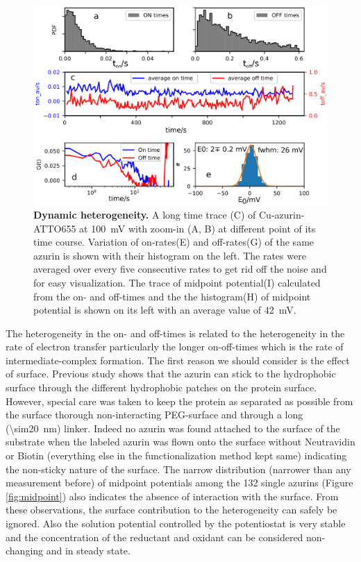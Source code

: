 \documentclass[journal=jacsat,manuscript=article]{achemso}
\begin{document}
\begin{figure}
	\centering
	\includegraphics{long_azurin_trace}
	\caption{\textbf{Dynamic heterogeneity.} A long time trace (C) of Cu-azurin-ATTO655 at \SI{100}{\mV} with zoom-in (A, B) at different point of its time course.
	Variation of on-rates(E) and off-rates(G) of the same azurin is shown with their histogram on the left.
	The rates were averaged over every five consecutive rates to get rid off the noise and for easy visualization.
	The trace of midpoint potential(I) calculated from the on- and off-times and the the histogram(H) of midpoint potential is shown on its left with an average value of \SI{42}{\mV}.
	}
	\label{fig:long_azurin_trace}
\end{figure}

The heterogeneity in the on- and off-times is related to the heterogeneity in the rate of electron transfer particularly the longer on-off-times which is the rate of intermediate-complex formation.
The first reason we should consider is the effect of surface.
Previous study shows that the azurin can stick to the hydrophobic surface through the different hydrophobic patches on the protein surface.\cite{patil2010visualizing,salverda2010fluorescent,akkilic2014chemically-induced}
However, special care was taken to keep the protein as separated as possible from the surface thorough non-interacting PEG-surface and through a long (\SI{\sim20}{\nm}) linker.
Indeed no azurin was found attached to the surface of the substrate when the labeled azurin was flown onto the surface without Neutravidin or Biotin (everything else in the functionalization method kept same) indicating the non-sticky nature of the surface.
The narrow distribution (narrower than any measurement before) of midpoint potentials among the 132 single azurins (Figure \ref{fig:midpoint}) also indicates the absence of interaction with the surface.
From these observations, the surface contribution to the heterogeneity can safely be ignored.
Also the solution potential controlled by the potentiostat is very stable and the concentration of the reductant and oxidant can be considered non-changing and in steady state.
\end{document}

